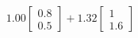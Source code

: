 \documentclass[preview]{standalone}
\begin{document}
\begin{align*}
1.00 \begin{bmatrix} 0.8 \\ 0.5 \end{bmatrix} + 1.32 \begin{bmatrix} 1 \\ 1.6 \end{bmatrix}
\end{align*}
\end{document}
